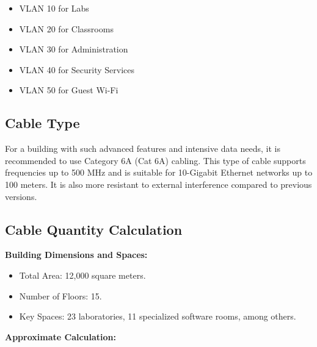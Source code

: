 \documentclass[12pt]{article}
\begin{document}
\begin{itemize}
    \item VLAN 10 for Labs
    \item VLAN 20 for Classrooms
    \item VLAN 30 for Administration
    \item VLAN 40 for Security Services
    \item VLAN 50 for Guest Wi-Fi
\end{itemize}

\subsection{Cable Type}

For a building with such advanced features and intensive data needs, it is recommended to use Category 6A (Cat 6A) cabling. This type of cable supports frequencies up to 500 MHz and is suitable for 10-Gigabit Ethernet networks up to 100 meters. It is also more resistant to external interference compared to previous versions.

\subsection{Cable Quantity Calculation}

\textbf{Building Dimensions and Spaces:}

\begin{itemize}
    \item Total Area: 12,000 square meters.
    \item Number of Floors: 15.
    \item Key Spaces: 23 laboratories, 11 specialized software rooms, among others.
\end{itemize}

\textbf{Approximate Calculation:}
\end{document}
